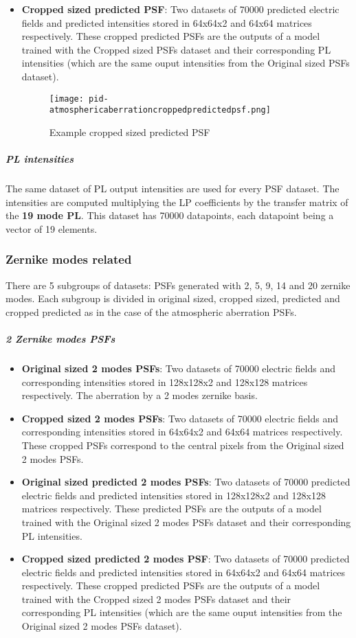 \begin{itemize}
\begin{figure*}[ht!]
				\end{figure*}			
				\item \textbf{Cropped sized predicted PSF}: Two datasets of 70000 predicted electric fields and predicted intensities stored in 64x64x2 and 64x64 matrices respectively. These cropped predicted PSFs are the outputs of a model trained with the Cropped sized PSFs dataset and their corresponding PL intensities (which are the same ouput intensities from the Original sized PSFs dataset).
				\begin{figure*}[ht!]
					\centering
					\texttt{[image: pid-atmosphericaberrationcroppedpredictedpsf.png]}
					\caption{Example cropped sized predicted PSF}\hspace{\fill}
				\end{figure*}
				\FloatBarrier			
			\end{itemize}
			
			
		\subparagraph{PL intensities}
		The same dataset of PL output intensities are used for every PSF dataset. The intensities are computed multiplying the LP coefficients by the transfer matrix of the \textbf{19 mode PL}. This dataset has 70000 datapoints, each datapoint being a vector of 19 elements.
		
		
	\subsubsection{Zernike modes related}
		There are 5 subgroups of datasets: PSFs generated with 2, 5, 9, 14 and 20 zernike modes. Each subgroup is divided in original sized, cropped sized, predicted and cropped predicted as in the case of the atmospheric aberration PSFs.
		
		
		\subparagraph{2 Zernike modes PSFs}
			\begin{itemize}
				\item \textbf{Original sized 2 modes PSFs}: Two datasets of 70000 electric fields and corresponding intensities stored in 128x128x2 and 128x128 matrices respectively. The aberration by a 2 modes zernike basis.		
				\item \textbf{Cropped sized 2 modes PSFs}:  Two datasets of 70000 electric fields and corresponding intensities stored in 64x64x2 and 64x64 matrices respectively. These cropped  PSFs correspond to the central pixels from the Original sized 2 modes PSFs.
				\item \textbf{Original sized predicted 2 modes PSFs}:  Two datasets of 70000 predicted electric fields and predicted intensities stored in 128x128x2 and 128x128 matrices respectively. These predicted PSFs are the outputs of a model trained with the Original sized 2 modes PSFs dataset and their corresponding PL intensities.
				\item \textbf{Cropped sized predicted 2 modes PSF}: Two datasets of 70000 predicted electric fields and predicted intensities stored in 64x64x2 and 64x64 matrices respectively. These cropped predicted PSFs are the outputs of a model trained with the Cropped sized 2 modes PSFs dataset and their corresponding PL intensities (which are the same ouput intensities from the Original sized 2 modes PSFs dataset).
			\end{itemize}
			
